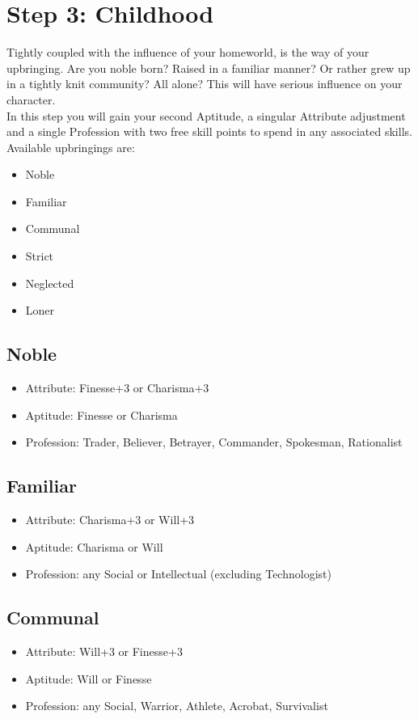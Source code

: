 
\section{Step 3: Childhood} %
\label{sec:lifepath_3_childhood}
Tightly coupled with the influence of your homeworld, is the way of your upbringing. Are you noble born? Raised in a familiar manner? Or rather grew up in a tightly knit community? All alone? This will have serious influence on your character.\\
In this step you will gain your second Aptitude, a singular Attribute adjustment and a single Profession with two free skill points to spend in any associated skills. Available upbringings are:
\begin{itemize}
	\item Noble
	\item Familiar
	\item Communal
	\item Strict
	\item Neglected
	\item Loner
\end{itemize}

\subsection{Noble}
\begin{itemize}
	\item Attribute: Finesse+3 or Charisma+3
	\item Aptitude: Finesse or Charisma
	\item Profession: Trader, Believer, Betrayer, Commander, Spokesman, Rationalist
\end{itemize}

\subsection{Familiar}
\begin{itemize}
	\item Attribute: Charisma+3 or Will+3
	\item Aptitude: Charisma or Will
	\item Profession: any Social or Intellectual (excluding Technologist)
\end{itemize}

\subsection{Communal}
\begin{itemize}
	\item Attribute: Will+3 or Finesse+3
	\item Aptitude: Will or Finesse
	\item Profession: any Social, Warrior, Athlete, Acrobat, Survivalist
\end{itemize}


